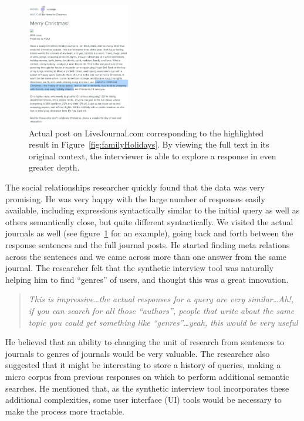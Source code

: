 \documentclass{sigchi}
\begin{document}
\begin{figure}[tb]
\centering \includegraphics[width=0.4\textwidth]{figures/examplePost2} 
\caption{Actual post on LiveJournal.com corresponding to the highlighted result in Figure~\ref{fig:familyHolidays}. By viewing the full text in its original context, the interviewer is able to explore a response in even greater depth. \label{fig:examplePost}}
\end{figure}

The social relationships researcher quickly found that the data was very promising. He was very happy with the large number of responses easily available, including expressions syntactically similar to the initial query as well as others semantically close, but quite different syntactically. We visited the actual journals as well (see figure~\ref{fig:examplePost} for an example), going back and forth between the response sentences and the full journal posts. He started finding meta relations across the sentences and we came across more than one answer from the same journal. The researcher felt that the synthetic interview tool was naturally helping him to find ``genres'' of users, and thought this was a great innovation. 

\begin{quote}
{\em
This is impressive\dots the actual responses for a query are very similar\dots Ah!, if you can search for all those ``authors'', people that write about the same topic you could get something like ``genres''\dots yeah, this would be very useful
}\end{quote}

He believed that an ability to changing the unit of research from sentences to journals to genres of journals would be very valuable. The researcher also suggested that it might be interesting to store a history of queries, making a micro corpus from previous responses on which to perform additional semantic searches. He mentioned that, as the synthetic interview tool incorporates these additional complexities, some user interface (UI) tools would be necessary to make the process more tractable. 
\end{document}
